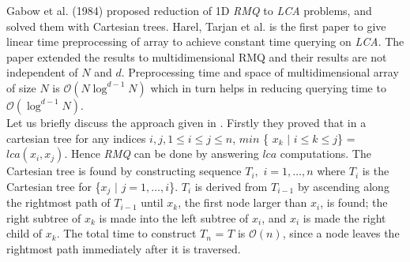Gabow et al. \cite{p5} (1984) proposed reduction of 1D \emph{RMQ} to \emph{LCA} problems, and solved them with Cartesian trees\cite{p9}. Harel, Tarjan et al. \cite{p4} is the first paper to give linear time preprocessing of array to achieve constant time querying on \emph{LCA}.  The paper extended the results to multidimensional RMQ and their results are not independent of $N$ and $d$. Preprocessing time and space of multidimensional array of size $N$ is $\mathcal{O}(N \log ^{d-1} N)$ which in turn helps in reducing querying time to $\mathcal{O}(\log^{d-1} N)$. \\

Let us briefly discuss the approach given in \cite{p5}. Firstly they proved that in a cartesian tree for any indices $i,j,1\leq i\leq j\leq n$, $min$ \{ $x_k$ $|$ $i \leq k \leq j$\} = $lca(x_i,x_j)$. Hence \emph{RMQ} can be done by answering $lca$ computations. The Cartesian tree is found by constructing sequence $T_i,$ $i = 1,\ldots,n$ where $T_i$ is the Cartesian tree for \{$x_j$ $|$ $j=1,\ldots,i$\}. $T_i$ is derived from $T_{i-1}$ by ascending along the rightmost path of $T_{i-1}$ until $x_k$, the first node larger than $x_i$, is found; the right subtree of $x_k$ is made into the left subtree of $x_i$, and $x_i$ is made the right child of $x_k$. The total time to construct $T_n$ = $T$ is $\mathcal{O}(n)$, since a node leaves the rightmost path immediately after it is traversed.\\